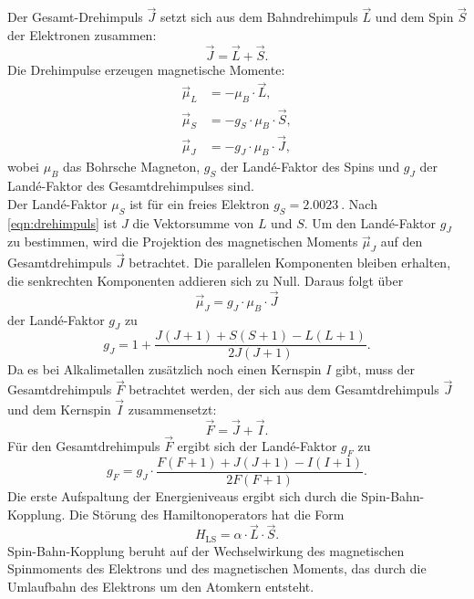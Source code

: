 Der Gesamt-Drehimpuls $\vec{J}$ setzt sich aus dem Bahndrehimpuls $\vec{L}$ und dem Spin $\vec{S}$ der Elektronen zusammen:
\begin{equation}\label{eqn:drehimpuls}
    \vec{J} = \vec{L} + \vec{S}.
\end{equation}
Die Drehimpulse erzeugen magnetische Momente:
\begin{align*}
    \vec{\mu}_L &= - \mu_B \cdot \vec{L}, \\
    \vec{\mu}_S &= - g_S \cdot \mu_B \cdot \vec{S}, \\
    \vec{\mu}_J &= - g_J \cdot \mu_B \cdot \vec{J},
\end{align*}
wobei $\mu_B$ das Bohrsche Magneton, $g_S$ der Landé-Faktor des Spins und $g_J$ der Landé-Faktor des Gesamtdrehimpulses sind.\\
Der Landé-Faktor $\mu_S$ ist für ein freies Elektron $g_S = \SI{2.0023}{}$. Nach \autoref{eqn:drehimpuls} ist $J$ die Vektorsumme von $L$ und $S$. Um den Landé-Faktor $g_J$ zu bestimmen, wird die Projektion
des magnetischen Moments $\vec{\mu}_J$ auf den Gesamtdrehimpuls $\vec{J}$ betrachtet. Die parallelen Komponenten bleiben erhalten, die senkrechten Komponenten addieren sich zu Null. Daraus folgt
über 
\begin{equation*}
    \vec{\mu}_J = g_J \cdot \mu_B \cdot \vec{J}
\end{equation*}
der Landé-Faktor $g_J$ zu 
\begin{equation*}
    g_J = 1 + \frac{J(J+1) + S(S+1) - L(L+1)}{2J(J+1)}.
\end{equation*}
Da es bei Alkalimetallen zusätzlich noch einen Kernspin $I$ gibt, muss der Gesamtdrehimpuls $\vec{F}$ betrachtet werden, der sich aus dem Gesamtdrehimpuls $\vec{J}$ und dem Kernspin $\vec{I}$ zusammensetzt:
\begin{equation*}
    \vec{F} = \vec{J} + \vec{I}.
\end{equation*}
Für den Gesamtdrehimpuls $\vec{F}$ ergibt sich der Landé-Faktor $g_F$ zu
\begin{equation*}
    g_F = g_J \cdot \frac{F(F+1) + J(J+1) - I(I+1)}{2F(F+1)}.
\end{equation*}
Die erste Aufspaltung der Energieniveaus ergibt sich durch die Spin-Bahn-Kopplung. Die Störung des Hamiltonoperators hat die Form
\begin{equation*}
    H_{\text{LS}} = \alpha \cdot \vec{L} \cdot \vec{S}.
\end{equation*}
Spin-Bahn-Kopplung beruht auf der Wechselwirkung des magnetischen Spinmoments des Elektrons und des magnetischen Moments, das durch die Umlaufbahn des Elektrons um den Atomkern entsteht.
